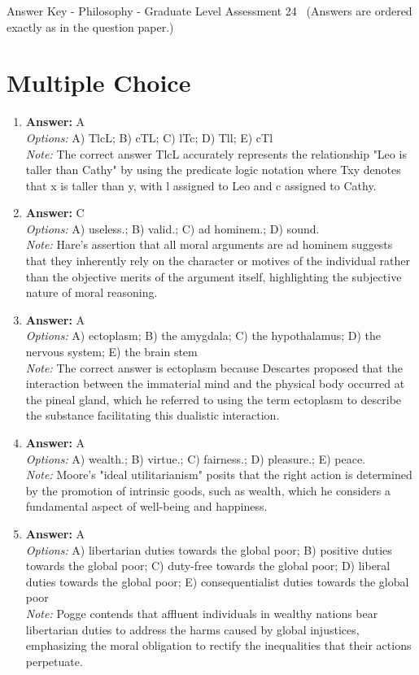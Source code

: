 \documentclass[12pt]{article}
\begin{document}
\begin{center}
Answer Key - Philosophy - Graduate Level Assessment 24 \
\small (Answers are ordered exactly as in the question paper.)
\end{center}

\section*{Multiple Choice}
\begin{enumerate}[label=\arabic*.]
\item \textbf{Answer:} A
\\ \textit{Options:} A) TlcL; B) cTL; C) lTc; D) Tll; E) cTl
\\ \textit{Note:} The correct answer TlcL accurately represents the relationship "Leo is taller than Cathy" by using the predicate logic notation where Txy denotes that x is taller than y, with l assigned to Leo and c assigned to Cathy.
\item \textbf{Answer:} C
\\ \textit{Options:} A) useless.; B) valid.; C) ad hominem.; D) sound.
\\ \textit{Note:} Hare's assertion that all moral arguments are ad hominem suggests that they inherently rely on the character or motives of the individual rather than the objective merits of the argument itself, highlighting the subjective nature of moral reasoning.
\item \textbf{Answer:} A
\\ \textit{Options:} A) ectoplasm; B) the amygdala; C) the hypothalamus; D) the nervous system; E) the brain stem
\\ \textit{Note:} The correct answer is ectoplasm because Descartes proposed that the interaction between the immaterial mind and the physical body occurred at the pineal gland, which he referred to using the term ectoplasm to describe the substance facilitating this dualistic interaction.
\item \textbf{Answer:} A
\\ \textit{Options:} A) wealth.; B) virtue.; C) fairness.; D) pleasure.; E) peace.
\\ \textit{Note:} Moore's "ideal utilitarianism" posits that the right action is determined by the promotion of intrinsic goods, such as wealth, which he considers a fundamental aspect of well-being and happiness.
\item \textbf{Answer:} A
\\ \textit{Options:} A) libertarian duties towards the global poor; B) positive duties towards the global poor; C) duty-free towards the global poor; D) liberal duties towards the global poor; E) consequentialist duties towards the global poor
\\ \textit{Note:} Pogge contends that affluent individuals in wealthy nations bear libertarian duties to address the harms caused by global injustices, emphasizing the moral obligation to rectify the inequalities that their actions perpetuate.
\end{enumerate}
\end{document}
